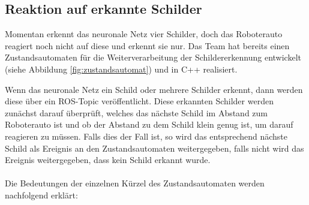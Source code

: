 \subsection{Reaktion auf erkannte Schilder}
Momentan erkennt das neuronale Netz vier Schilder, doch das Roboterauto reagiert noch nicht auf diese und erkennt sie nur. Das Team hat bereits einen Zustandsautomaten f\"ur die Weiterverarbeitung der Schildererkennung entwickelt (siehe Abbildung \ref{fig:zustandsautomat}) und in C++ realisiert.

Wenn das neuronale Netz ein Schild oder mehrere Schilder erkennt, dann werden diese \"uber ein ROS-Topic ver\"offentlicht. Diese erkannten Schilder werden zun\"achst darauf \"uberpr\"uft, welches das n\"achste Schild im Abstand zum Roboterauto ist und ob der Abstand zu dem Schild klein genug ist, um darauf reagieren zu m\"ussen. Falls dies der Fall ist, so wird das entsprechend n\"achste Schild als Ereignis an den Zustandsautomaten weitergegeben, falls nicht wird das Ereignis weitergegeben, dass kein Schild erkannt wurde.
\\\\Die Bedeutungen der einzelnen K\"urzel des Zustandsautomaten werden nachfolgend erkl\"art:
